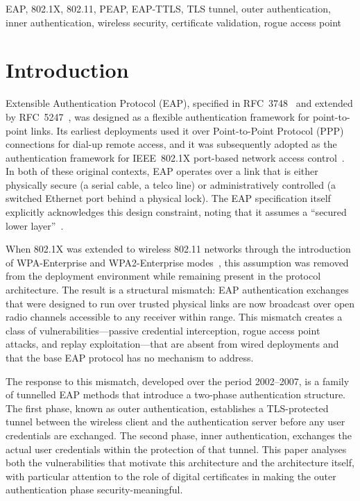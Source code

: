 \documentclass[journal]{IEEEtran}
\begin{document}
\begin{IEEEkeywords}
EAP, 802.1X, 802.11, PEAP, EAP-TTLS, TLS tunnel, outer authentication, inner
authentication, wireless security, certificate validation, rogue access point
\end{IEEEkeywords}

\section{Introduction}

 Extensible Authentication Protocol (EAP), specified in
RFC~3748~\cite{rfc3748} and extended by RFC~5247~\cite{rfc5247}, was designed as a
flexible authentication framework for point-to-point links. Its earliest deployments
used it over Point-to-Point Protocol (PPP) connections for dial-up remote access,
and it was subsequently adopted as the authentication framework for IEEE~802.1X
port-based network access control~\cite{ieee8021x}. In both of these original
contexts, EAP operates over a link that is either physically secure (a serial cable,
a telco line) or administratively controlled (a switched Ethernet port behind a
physical lock). The EAP specification itself explicitly acknowledges this design
constraint, noting that it assumes a ``secured lower layer''~\cite{rfc3748}.

When 802.1X was extended to wireless 802.11 networks through the introduction of
WPA-Enterprise and WPA2-Enterprise modes~\cite{ieee80211i}, this assumption was
removed from the deployment environment while remaining present in the protocol
architecture. The result is a structural mismatch: EAP authentication exchanges
that were designed to run over trusted physical links are now broadcast over open
radio channels accessible to any receiver within range. This mismatch creates a
class of vulnerabilities---passive credential interception, rogue access point
attacks, and replay exploitation---that are absent from wired deployments and that
the base EAP protocol has no mechanism to address.

The response to this mismatch, developed over the period 2002--2007, is a family
of tunnelled EAP methods that introduce a two-phase authentication structure. The
first phase, known as outer authentication, establishes a TLS-protected tunnel
between the wireless client and the authentication server before any user credentials
are exchanged. The second phase, inner authentication, exchanges the actual user
credentials within the protection of that tunnel. This paper analyses both the
vulnerabilities that motivate this architecture and the architecture itself, with
particular attention to the role of digital certificates in making the outer
authentication phase security-meaningful.
\end{document}
